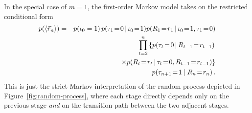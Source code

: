 \documentclass[a4paper]{article}
\begin{document}
In the special case of $m=1$, the first-order Markov model takes on the restricted conditional form
\begin{eqnarray}
p(\langle\vec{r}_n\rangle) & = &
p(\iota_0=1)\,p(\tau_1\!=\!0\,|\,\iota_0\!=\!1)
p(R_1\!=\!r_1\,|\,\iota_0\!=\!1,\tau_1\!=\!0)
\nonumber\\&&
\prod_{t=2}^{n}\left\{p(\tau_t\!=\!0\,|\,R_{t-1}\!=\!r_{t-1})\right.
\nonumber\\&&
\hspace*{10mm}\left.\times p(R_t\!=\!r_t\,|\,\tau_t\!=\!0,R_{t-1}\!=\!r_{t-1})\right\}
\nonumber\\&&
p(\tau_{n+1}\!=\!1\:|\;R_n\!=\!r_n)
\,.
\end{eqnarray}
This is just the strict Markov interpretation of the random process depicted in Figure~\ref{fig:random-process},
where each stage directly depends only on the previous stage {\em and} on the transition path between the two adjacent stages.
\end{document}
